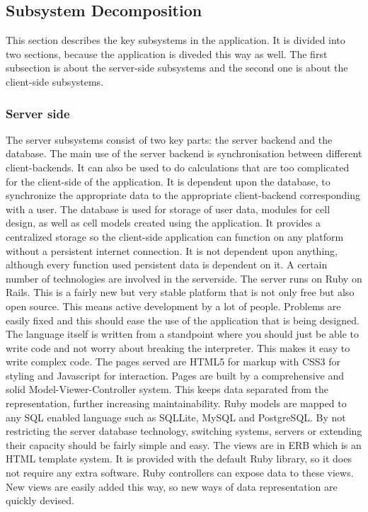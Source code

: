 \documentclass{report}
\begin{document}
		\subsection{Subsystem Decomposition}
			This section describes the key subsystems in the application. It is divided into two sections, because the application is diveded this way as well. The first subsection is about the server-side subsystems and the second one is about the client-side subsystems.
			\subsubsection{Server side}
				The server subsystems consist of two key parts: the server backend and the database. The main use of the server backend is synchronisation between different client-backends. It can also be used to do calculations that are too complicated for the client-side of the application. It is dependent upon the database, to synchronize the appropriate data to the appropriate client-backend corresponding with a user.
				The database is used for storage of user data, modules for cell design, as well as cell models created using the application. It provides a centralized storage so the client-side application can function on any platform without a persistent internet connection. It is not dependent upon anything, although every function used persistent data is dependent on it. 
				A certain number of technologies are involved in the serverside.
					The server runs on Ruby on Rails. This is a fairly new but very stable platform that is not only free but also open source. This means active development by a lot of people. Problems are easily fixed and this should ease the use of the application that is being designed. The language itself is written from a standpoint where you should just be able to write code and not worry about breaking the interpreter. This makes it easy to write complex code.
					The pages served are HTML5 for markup with CSS3 for styling and Javascript for interaction. Pages are built by a comprehensive and solid Model-Viewer-Controller system. This keeps data separated from the representation, further increasing maintainability. 
					Ruby models are mapped to any SQL enabled language such as SQLLite, MySQL and PostgreSQL. By not restricting the server database technology, switching systems, servers or extending  their capacity should be fairly simple and easy.
					The views are in ERB which is an HTML template system. It is provided with the default Ruby library, so it does not require any extra software. Ruby controllers can expose data to these views. New views are easily added this way, so new ways of data representation are quickly devised.
\end{document}
